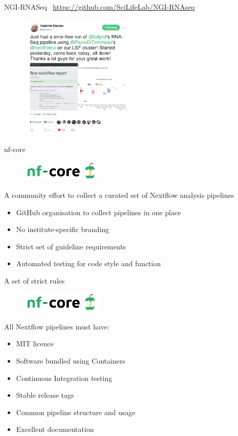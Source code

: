 \documentclass{beamer}
\begin{document}
\begin{frame}{NGI-RNASeq}
	\faGlobe\ \url{https://github.com/SciLifeLab/NGI-RNAseq}
	\begin{figure}
		\includegraphics[height=6cm]{pictures/ErrorFreeRun.png}
	\end{figure}
\end{frame}

\begin{frame}{nf-core}
	\begin{figure}
		\includegraphics[height=1cm]{pictures/nf-core-logo}
	\end{figure}
	A community effort to collect a curated set of Nextflow analysis pipelines
	\begin{itemize}
		\item GitHub organisation to collect pipelines in one place
		\item No institute-specific branding
		\item Strict set of guideline requirements
		\item Automated testing for code style and function
	\end{itemize}
\end{frame}

\begin{frame}{A set of strict rules}
	\begin{figure}
		\includegraphics[height=1cm]{pictures/nf-core-logo}
	\end{figure}
	All Nextflow pipelines must have:
	\begin{itemize}
		\item MIT licence
		\item Software bundled using Containers
		\item Continuous Integration testing
		\item Stable release tags
		\item Common pipeline structure and usage
		\item Excellent documentation
	\end{itemize}
\end{frame}
\end{document}
